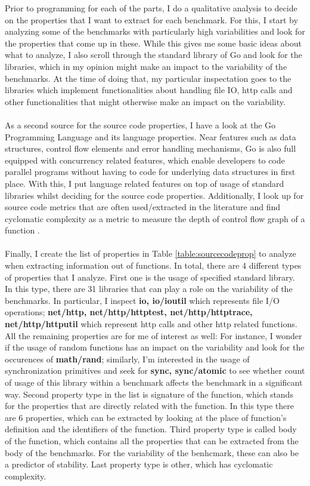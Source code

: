 \documentclass{seal_thesis}
\begin{document}
Prior to programming for each of the parts, I do a qualitative analysis to decide on the properties that I want to extract for each benchmark. For this, I start by analyzing some of the benchmarks with particularly high variabilities and look for the properties that come up in these. While this gives me some basic ideas about what to analyze, I also scroll through the standard library of Go \cite{gopackages} and look for the libraries, which in my opinion might make an impact to the variability of the benchmarks. At the time of doing that, my particular inspectation goes to the libraries which implement functionalities about handling file IO, http calls and other functionalities that might otherwise make an impact on the variability.\\
\\
As a second source for the source code properties, I have a look at the Go Programming Language \cite{go} and its language properties. Near features such as data structures, control flow elements and error handling mechanisms, Go is also full equipped with concurrency related features, which enable developers to code parallel programs without having to code for underlying data structures in first place. With this, I put language related features on top of usage of standard libraries whilst deciding for the source code properties. Additionally, I look up for source code metrics that are often used/extracted in the literature and find cyclomatic complexity as a metric to measure the depth of control flow graph of a function \cite{shepperd1988critique}.\\
\\
Finally, I create the list of properties in Table \ref{table:sourcecodeprop} to analyze when extracting information out of functions. In total, there are 4 different types of properties that I analyze. First one is the usage of specified standard library. In this type, there are 31 libraries that can play a role on the variability of the benchmarks. In particular, I inspect \textbf{io, io/ioutil} which represents file I/O operations; \textbf{net/http, net/http/httptest, net/http/httptrace, net/http/httputil} which represent http calls and other http related functions. All the remaining properties are for me of interest as well: For instance, I wonder if the usage of random functions has an impact on the variability and look for the occurences of \textbf{math/rand}; similarly, I'm interested in the usage of synchronization primitives and seek for \textbf{sync, sync/atomic} to see whether count of usage of this library within a benchmark affects the benchmark in a significant way. Second property type in the list is signature of the function, which stands for the properties that are directly related with the function. In this type there are 6 properties, which can be extracted by looking at the place of function's definition and the identifiers of the function. Third property type is called body of the function, which contains all the properties that can be extracted from the body of the benchmarks. For the variability of the benhcmark, these can also be a predictor of stability. Last property type is other, which has cyclomatic complexity.\\
\end{document}

